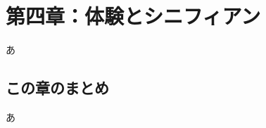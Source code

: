 \section{第四章：体験とシニフィアン}\label{ux7b2cux56dbux7ae0ux4f53ux9a13ux3068ux30b7ux30cbux30d5ux30a3ux30a2ux30f3}

あ

\subsection{この章のまとめ}\label{ux3053ux306eux7ae0ux306eux307eux3068ux3081}

あ
